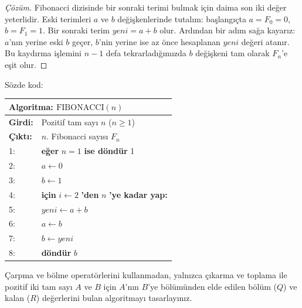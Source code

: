 \begin{proof}[Çözüm]
Fibonacci dizisinde bir sonraki terimi bulmak için daima son iki değer yeterlidir. Eski terimleri $a$ ve $b$ değişkenlerinde tutalım: başlangıçta $a = F_0 = 0$, $b = F_1 = 1$.
Bir sonraki terim $yeni = a + b$ olur.
Ardından bir adım sağa kayarız: $a$'nın yerine eski $b$ geçer, $b$'nin yerine ise az önce hesaplanan $yeni$ değeri atanır.
Bu kaydırma işlemini $n-1$ defa tekrarladığımızda $b$ değişkeni tam olarak $F_n$'e eşit olur.
\end{proof}

Sözde kod:
\begin{center}
\begin{minipage}{1.0\textwidth}
\begin{tabular}{p{2.4cm}p{9.4cm}}
\hline
\multicolumn{2}{l}{\textbf{Algoritma:} $\text{FIBONACCI}(n)$} \\
\hline
\textbf{Girdi:} & Pozitif tam sayı $n$ ($n \ge 1$) \\
\textbf{Çıktı:} & $n$. Fibonacci sayısı $F_n$ \\
1: & \textbf{eğer} $n = 1$ \textbf{ise döndür} 1 \\
2: & $a \leftarrow 0$ \\
3: & $b \leftarrow 1$ \\
4: & \textbf{için} $i \leftarrow 2$ \textbf{'den} $n$ \textbf{'ye kadar yap:} \\
5: & \quad $yeni \leftarrow a + b$ \\
6: & \quad $a \leftarrow b$ \\
7: & \quad $b \leftarrow yeni$ \\
8: & \textbf{döndür} $b$ \\
\hline
\end{tabular}
\end{minipage}
\end{center}

\begin{example}
Çarpma ve bölme operatörlerini kullanmadan, yalnızca çıkarma ve toplama ile pozitif iki tam sayı $A$ ve $B$ için $A$'nın $B$'ye bölümünden elde edilen bölüm ($Q$) ve kalan ($R$) değerlerini bulan algoritmayı tasarlayınız.
\end{example}

